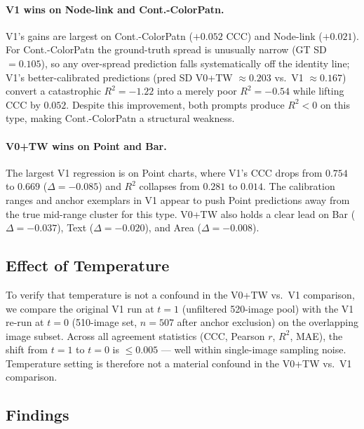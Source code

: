 \paragraph{V1 wins on Node-link and Cont.-ColorPatn.}
V1's gains are largest on Cont.-ColorPatn ($+0.052$ CCC) and Node-link
($+0.021$). For Cont.-ColorPatn the ground-truth spread is unusually
narrow (GT SD $= 0.105$), so any over-spread prediction falls
systematically off the identity line; V1's better-calibrated predictions
(pred SD V0+TW $\approx 0.203$ vs.\ V1 $\approx 0.167$) convert a
catastrophic $R^2 = -1.22$ into a merely poor $R^2 = -0.54$ while
lifting CCC by $0.052$. Despite this improvement, both prompts produce
$R^2 < 0$ on this type, making Cont.-ColorPatn a structural weakness.

\paragraph{V0+TW wins on Point and Bar.}
The largest V1 regression is on Point charts, where V1's CCC drops from
$0.754$ to $0.669$ ($\Delta = -0.085$) and $R^2$ collapses from
$0.281$ to $0.014$. The calibration ranges and anchor exemplars in V1
appear to push Point predictions away from the true mid-range cluster
for this type. V0+TW also holds a clear lead on Bar ($\Delta = -0.037$),
Text ($\Delta = -0.020$), and Area ($\Delta = -0.008$).

\subsection{Effect of Temperature}
\label{app:fullset-temp}

To verify that temperature is not a confound in the V0+TW vs.\ V1
comparison, we compare the original V1 run at $t = 1$ (unfiltered
520-image pool) with the V1 re-run at $t = 0$ (510-image set,
$n = 507$ after anchor exclusion) on the overlapping image subset. Across all agreement statistics (CCC, Pearson $r$,
$R^2$, MAE), the shift from $t = 1$ to $t = 0$ is $\leq 0.005$ ---
well within single-image sampling noise. Temperature setting is
therefore not a material confound in the V0+TW vs.\ V1 comparison.

\subsection{Findings}
\label{app:fullset-findings}

